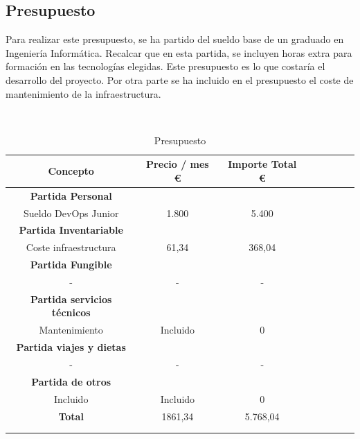 \subsection{Presupuesto}
        \begin{text}
                Para realizar este presupuesto, se ha partido del sueldo base de un graduado en Ingeniería Informática. Recalcar que en esta partida, se incluyen horas extra para formación en las tecnologías elegidas. Este presupuesto es lo que costaría el desarrollo del proyecto.
                Por otra parte se ha incluido en el presupuesto el coste de mantenimiento de la infraestructura.
        \end{text}
        \\
        \begin{table}[ht]
                \centering
                \begin{tabular}[!hbt]{SSSSSSSS} \toprule
                        {Concepto} &  {Precio / mes \euro} & {Importe Total \euro} \\ \midrule
                        {\textbf{Partida Personal}} \\ \midrule
                        {Sueldo DevOps Junior}  & {1.800} & {5.400}  \\
                    \midrule
                        {\textbf{Partida Inventariable}} \\ \midrule
                        {Coste infraestructura}  & {61,34}  & {368,04}   \\
                        \midrule
                        {\textbf{Partida Fungible}} \\ \midrule
                        {-}  & {-}  & {-}   \\
                        \midrule
                        {\textbf{Partida servicios técnicos}} \\ \midrule
                        {Mantenimiento}  & {Incluido}  & {0} \\
                        \midrule
                        {\textbf{Partida viajes y dietas}} \\ \midrule
                        {-}  & {-}  & {-} \\
                        \midrule
                        {\textbf{Partida de otros}} \\ \midrule
                        {Incluido}  & {Incluido}  & {0} \\
                        \midrule
                        {\textbf{Total}}  & {1861,34}  & {5.768,04} \\
                        \\ \midrule
                 \\ \bottomrule
                \end{tabular}
                \caption[Presupuesto]{Presupuesto \cite{presupuesto:online}} 
                \label{Presupuesto}
        \end{table}

